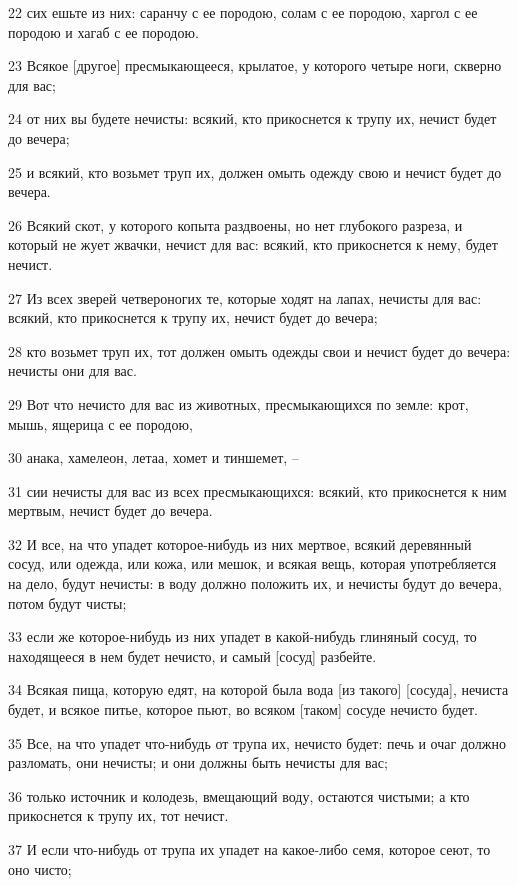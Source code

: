 \par 22 сих ешьте из них: саранчу с ее породою, солам с ее породою, харгол с ее породою и хагаб с ее породою.
\par 23 Всякое [другое] пресмыкающееся, крылатое, у которого четыре ноги, скверно для вас;
\par 24 от них вы будете нечисты: всякий, кто прикоснется к трупу их, нечист будет до вечера;
\par 25 и всякий, кто возьмет труп их, должен омыть одежду свою и нечист будет до вечера.
\par 26 Всякий скот, у которого копыта раздвоены, но нет глубокого разреза, и который не жует жвачки, нечист для вас: всякий, кто прикоснется к нему, будет нечист.
\par 27 Из всех зверей четвероногих те, которые ходят на лапах, нечисты для вас: всякий, кто прикоснется к трупу их, нечист будет до вечера;
\par 28 кто возьмет труп их, тот должен омыть одежды свои и нечист будет до вечера: нечисты они для вас.
\par 29 Вот что нечисто для вас из животных, пресмыкающихся по земле: крот, мышь, ящерица с ее породою,
\par 30 анака, хамелеон, летаа, хомет и тиншемет, --
\par 31 сии нечисты для вас из всех пресмыкающихся: всякий, кто прикоснется к ним мертвым, нечист будет до вечера.
\par 32 И все, на что упадет которое-нибудь из них мертвое, всякий деревянный сосуд, или одежда, или кожа, или мешок, и всякая вещь, которая употребляется на дело, будут нечисты: в воду должно положить их, и нечисты будут до вечера, потом будут чисты;
\par 33 если же которое-нибудь из них упадет в какой-нибудь глиняный сосуд, то находящееся в нем будет нечисто, и самый [сосуд] разбейте.
\par 34 Всякая пища, которую едят, на которой была вода [из такого] [сосуда], нечиста будет, и всякое питье, которое пьют, во всяком [таком] сосуде нечисто будет.
\par 35 Все, на что упадет что-нибудь от трупа их, нечисто будет: печь и очаг должно разломать, они нечисты; и они должны быть нечисты для вас;
\par 36 только источник и колодезь, вмещающий воду, остаются чистыми; а кто прикоснется к трупу их, тот нечист.
\par 37 И если что-нибудь от трупа их упадет на какое-либо семя, которое сеют, то оно чисто;
